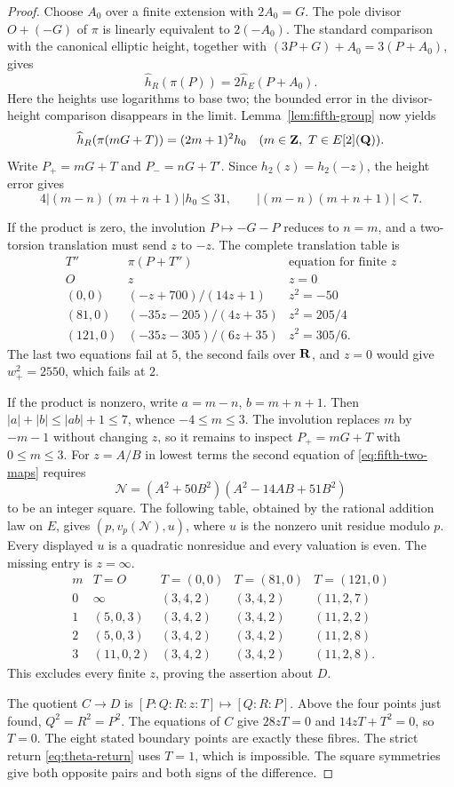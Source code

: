 \begin{proof}
Choose $A_0$ over a finite extension with $2A_0=G$.
The pole divisor $O+(-G)$ of $\pi$ is linearly equivalent to
$2(-A_0)$.  The standard comparison with the canonical elliptic
height, together with
$(3P+G)+A_0=3(P+A_0)$, gives
\[
 \widehat h_R(\pi(P))=2\widehat h_E(P+A_0).
\]
Here the heights use logarithms to base two; the bounded error in
the divisor-height comparison disappears in the limit.
Lemma~\ref{lem:fifth-group} now yields
\begin{equation}
 \widehat h_R(\pi(mG+T))=(2m+1)^2h_0
 \quad(m\in\mathbf Z,\ T\in E[2](\mathbf Q)).
 \label{eq:fifth-height-multiple}
\end{equation}
Write $P_+=mG+T$ and $P_-=nG+T'$.
Since $h_2(z)=h_2(-z)$, the height error gives
\[
 4|(m-n)(m+n+1)|h_0\leq31,
 \qquad |(m-n)(m+n+1)|<7.
\]

If the product is zero, the involution $P\mapsto-G-P$
reduces to $n=m$, and a two-torsion translation must send $z$
to $-z$.  The complete translation table is
\[
\begin{array}{c|c|c}
T''&\pi(P+T'')&\text{equation for finite }z\\\hline
O&z&z=0\\
(0,0)&(-z+700)/(14z+1)&z^2=-50\\
(81,0)&(-35z-205)/(4z+35)&z^2=205/4\\
(121,0)&(-35z-305)/(6z+35)&z^2=305/6.
\end{array}
\]
The last two equations fail at $5$, the second fails over $\mathbf R$,
and $z=0$ would give $w_+^2=2550$, which fails at $2$.

If the product is nonzero, write $a=m-n$, $b=m+n+1$.
Then $|a|+|b|\leq|ab|+1\leq7$, whence $-4\leq m\leq3$.
The involution replaces $m$ by $-m-1$ without changing $z$,
so it remains to inspect $P_+=mG+T$ with $0\leq m\leq3$.
For $z=A/B$ in lowest terms the second equation of
\eqref{eq:fifth-two-maps} requires
\[
 \mathcal N=(A^2+50B^2)(A^2-14AB+51B^2)
\]
to be an integer square.  The following table, obtained by the
rational addition law on $E$, gives $(p,v_p(\mathcal N),u)$,
where $u$ is the nonzero unit residue modulo $p$.
Every displayed $u$ is a quadratic nonresidue and every valuation
is even.  The missing entry is $z=\infty$.
\[
\begin{array}{c|cccc}
 m&T=O&T=(0,0)&T=(81,0)&T=(121,0)\\\hline
 0&\infty&(3,4,2)&(3,4,2)&(11,2,7)\\
 1&(5,0,3)&(3,4,2)&(3,4,2)&(11,2,2)\\
 2&(5,0,3)&(3,4,2)&(3,4,2)&(11,2,8)\\
 3&(11,0,2)&(3,4,2)&(3,4,2)&(11,2,8).
\end{array}
\]
This excludes every finite $z$, proving the assertion about $D$.

The quotient $C\to D$ is $[P:Q:R:z:T]\mapsto[Q:R:P]$.
Above the four points just found, $Q^2=R^2=P^2$.
The equations of $C$ give $28zT=0$ and $14zT+T^2=0$,
so $T=0$.  The eight stated boundary points are exactly these
fibres.  The strict return \eqref{eq:theta-return} uses $T=1$,
which is impossible.  The square symmetries give both opposite
pairs and both signs of the difference.
\end{proof}


